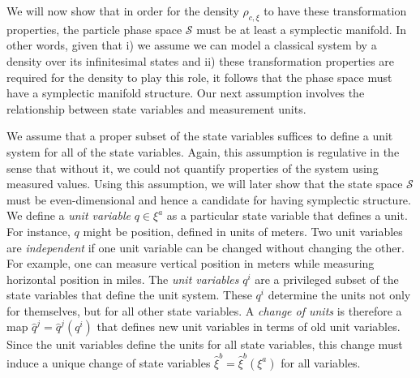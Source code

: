 \documentclass[12pt, english, twoside]{article} %
\begin{document}
We will now show that in order for the density $\rho_{c, \xi}$ to have these transformation properties, the particle phase space $\mathcal{S}$ must be at least a symplectic manifold. In other words, given that i) we assume we can model a classical system by a density over its infinitesimal states and ii) these transformation properties are required for the density to play this role, it follows that the phase space must have a symplectic manifold structure. Our next assumption involves the relationship between state variables and measurement units. 

We assume that a proper subset of the state variables suffices to define a unit system for all of the state variables. Again, this assumption is regulative in the sense that without it, we could not quantify properties of the system using measured values. Using this assumption, we will later show that the state space $\mathcal{S}$ must be even-dimensional and hence a candidate for having symplectic structure. We define a \textit{unit variable} $q \in \xi^a$ as a particular state variable that defines a unit. For instance, $q$ might be position, defined in units of meters. Two unit variables are \textit{independent} if one unit variable can be changed without changing the other. For example, one can measure vertical position in meters while measuring horizontal position in miles.  The \textit{unit variables} $q^i$ are a privileged subset of the state variables that define the unit system. These $q^i$ determine the units not only for themselves, but for all other state variables. A \textit{change of units} is therefore a map $\hat{q}^j = \hat{q}^j(q^i)$ that defines new unit variables in terms of old unit variables. Since the unit variables define the units for all state variables, this change must induce a unique change of state variables $\hat{\xi}^b = \hat{\xi}^b(\xi^a)$ for all variables.
\end{document}
